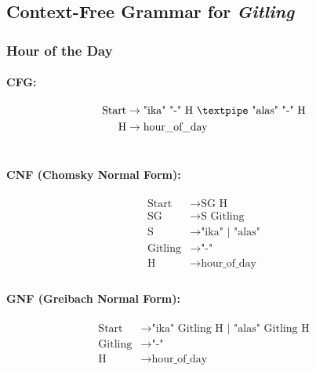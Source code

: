 \subsection{Context-Free Grammar for \textit{Gitling}}

\subsubsection{Hour of the Day}

\paragraph{CFG:}

\begin{equation*}
    \begin{aligned}
        \text{Start}   & \rightarrow \text{"ika" "-" H {\textpipe} "alas" "-" H}   \\
        \text{H} & \rightarrow \text{hour\_of\_day}   \\                                \\
    \end{aligned}
\end{equation*}

\paragraph{CNF (Chomsky Normal Form):}

\begin{equation*}
    \begin{aligned}
        \text{Start}   & \rightarrow \text{SG H} \\
        \text{SG}      & \rightarrow \text{S Gitling}\\
        \text{S}    & \rightarrow \text{"ika" | "alas"}\\        
        \text{Gitling} & \rightarrow \text{"-"}\\
        \text{H}   & \rightarrow \text{hour\_of\_day}\\
    \end{aligned}
\end{equation*}

\paragraph{GNF (Greibach Normal Form):}

\begin{equation*}
    \begin{aligned}
        \text{Start}   & \rightarrow \text{"ika" Gitling H | "alas" Gitling H}\\
        \text{Gitling} & \rightarrow \text{"-"}\\
        \text{H}   & \rightarrow \text{hour\_of\_day}\\
    \end{aligned}
\end{equation*}

